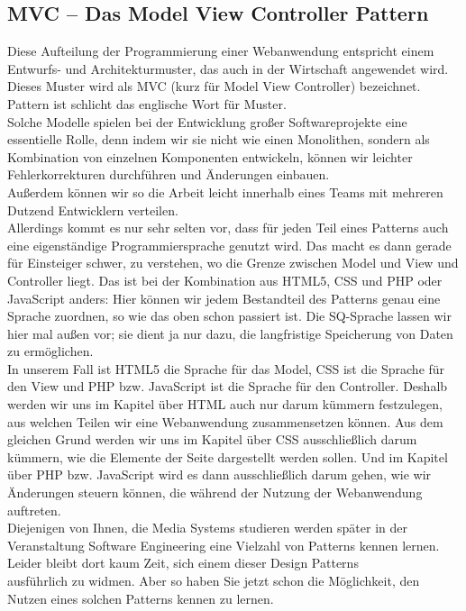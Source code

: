 \subsection{MVC – Das Model View Controller Pattern}

Diese Aufteilung der Programmierung einer Webanwendung entspricht einem Entwurfs- und Architekturmuster, das auch in der Wirtschaft angewendet wird. Dieses Muster wird als MVC (kurz für Model View Controller) bezeichnet. Pattern ist schlicht das englische Wort für Muster.\\

Solche Modelle spielen bei der Entwicklung großer Softwareprojekte eine essentielle Rolle, denn indem wir sie nicht wie einen Monolithen, sondern als Kombination von einzelnen Komponenten entwickeln, können wir leichter Fehlerkorrekturen durchführen und Änderungen einbauen.\\ Außerdem können wir so die Arbeit leicht innerhalb eines Teams mit mehreren Dutzend Entwicklern verteilen.\\

Allerdings kommt es nur sehr selten vor, dass für jeden Teil eines Patterns auch eine eigenständige Programmiersprache genutzt wird. Das macht es dann gerade für Einsteiger schwer, zu verstehen, wo die Grenze zwischen Model und View und Controller liegt. Das ist bei der Kombination aus HTML5, CSS und PHP oder JavaScript anders: Hier können wir jedem Bestandteil des Patterns genau eine Sprache zuordnen, so wie das oben schon passiert ist. Die SQ-Sprache lassen wir hier mal außen vor; sie dient ja nur dazu, die langfristige Speicherung von Daten zu ermöglichen.\\

In unserem Fall ist HTML5 die Sprache für das Model, CSS ist die Sprache für den View und PHP bzw. JavaScript ist die Sprache für den Controller. Deshalb werden wir uns im Kapitel über HTML auch nur darum kümmern festzulegen, aus welchen Teilen wir eine Webanwendung zusammensetzen können. Aus dem gleichen Grund werden wir uns im Kapitel über CSS ausschließlich darum kümmern, wie die Elemente der Seite dargestellt werden sollen. Und im Kapitel über PHP bzw. JavaScript wird es dann ausschließlich darum gehen, wie wir Änderungen steuern können, die während der Nutzung der Webanwendung auftreten.\\

Diejenigen von Ihnen, die Media Systems studieren werden später in der Veranstaltung Software Engineering eine Vielzahl von Patterns kennen lernen. Leider bleibt dort kaum Zeit, sich einem dieser Design Patterns\\ ausführlich zu widmen. Aber so haben Sie jetzt schon die Möglichkeit, den Nutzen eines solchen Patterns kennen zu lernen.\\

